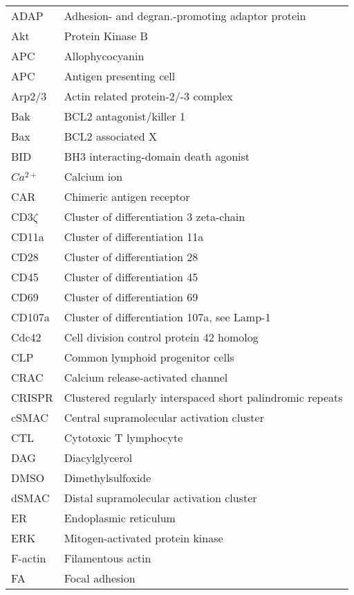 \documentclass[phd,tocprelim]{cornell}
\renewcommand{\caption}[1]{\singlespacing\hangcaption{#1}\normalspacing}
\begin{document}
\abbrlist
\begin{longtable}{ p{} p{} }
	ADAP & Adhesion- and degran.-promoting adaptor protein \\	
	Akt & Protein Kinase B \\
	APC & Allophycocyanin \\
	APC & Antigen presenting cell \\
	Arp2/3 	& Actin related protein-2/-3 complex \\
	Bak & BCL2 antagonist/killer 1 \\
	Bax & BCL2 associated X \\
	BID & BH3 interacting-domain death agonist \\
	$Ca^{2+}$ & Calcium ion \\
	CAR & Chimeric antigen receptor \\
	CD3$\zeta$ & Cluster of differentiation 3 zeta-chain \\
	CD11a & Cluster of differentiation 11a \\
	CD28 & Cluster of differentiation 28 \\
	CD45 & Cluster of differentiation 45 \\
	CD69 & Cluster of differentiation 69 \\
	CD107a & Cluster of differentiation 107a, see Lamp-1 \\
	Cdc42 & Cell division control protein 42 homolog \\
	CLP & Common lymphoid progenitor cells \\
	CRAC &  Calcium release-activated channel \\
	CRISPR & Clustered regularly interspaced short palindromic repeats \\
	cSMAC & Central supramolecular activation cluster \\
	CTL & Cytotoxic T lymphocyte \\
	DAG & Diacylglycerol \\
	DMSO & Dimethylsulfoxide \\
	dSMAC & Distal supramolecular activation cluster \\
	ER & Endoplasmic reticulum \\	
	ERK  & Mitogen-activated protein kinase \\
	F-actin & Filamentous actin \\
	FA & Focal adhesion \\

\end{longtable}
\end{document}
